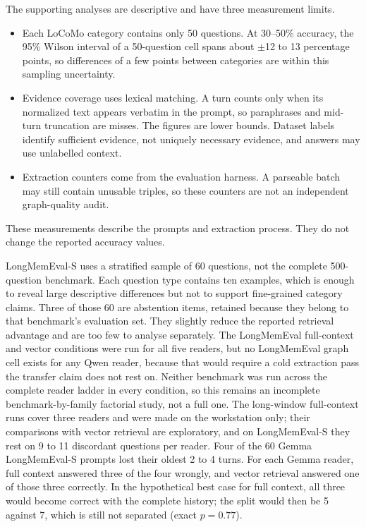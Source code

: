 The supporting analyses are descriptive and have three measurement limits.

\begin{itemize}
  \item Each LoCoMo category contains only 50 questions. At 30--50\% accuracy, the 95\% Wilson interval
        of a 50-question cell spans about $\pm$12 to 13 percentage points, so differences of a few
        points between categories are within this sampling uncertainty.
  \item Evidence coverage uses lexical matching. A turn counts only when its normalized text appears
        verbatim in the prompt, so paraphrases and mid-turn truncation are misses. The figures are
        lower bounds. Dataset labels identify sufficient evidence, not uniquely necessary evidence,
        and answers may use unlabelled context.
  \item Extraction counters come from the evaluation harness. A parseable batch may still contain
        unusable triples, so these counters are not an independent graph-quality audit.
\end{itemize}

These measurements describe the prompts and extraction process. They do not change the reported
accuracy values.

LongMemEval-S uses a stratified sample of 60 questions, not the complete 500-question benchmark.
Each question type contains ten examples, which is enough to reveal large descriptive differences
but not to support fine-grained category claims. Three of those 60 are abstention items, retained
because they belong to that benchmark's evaluation set. They slightly reduce the reported retrieval
advantage and are too few to analyse separately. The LongMemEval full-context and vector conditions
were run for all five readers, but no LongMemEval graph cell exists for any Qwen reader,
because that would require a cold extraction pass the transfer claim does not rest on. Neither
benchmark was run across the complete reader ladder in every condition, so this remains an
incomplete benchmark-by-family factorial study, not a full one. The long-window full-context runs
cover three readers and were made on the workstation only; their comparisons with vector retrieval
are exploratory, and on LongMemEval-S they rest on 9 to 11 discordant questions per reader. Four
of the 60 Gemma LongMemEval-S prompts lost their oldest 2 to 4 turns. For each Gemma reader, full
context answered three of the four wrongly, and vector retrieval answered one of those three
correctly. In the hypothetical best case for full context, all three would become correct with the
complete history; the split would then be 5 against 7, which is still not separated (exact $p=0.77$).


